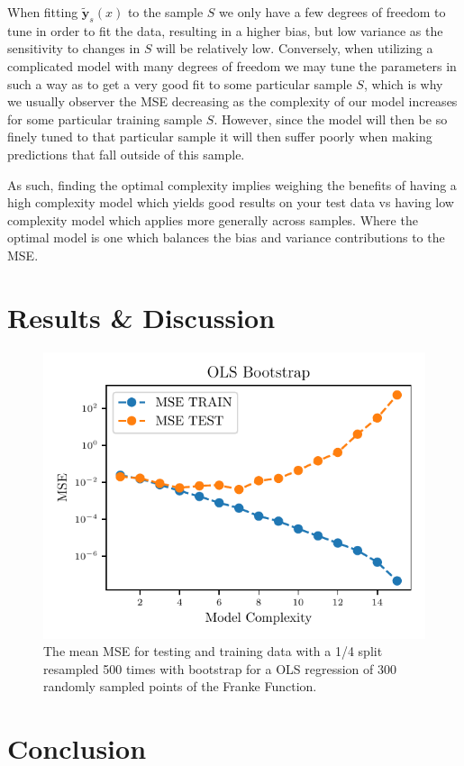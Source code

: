 \documentclass[reprint, english, nofootinbib]{revtex4-2}
\begin{document}
        When fitting $\mathbf{\tilde y}_s(x)$ to the sample $S$ we only have a few degrees of freedom to tune in order to fit the data, resulting in a higher bias, but low variance as the sensitivity to changes in $S$ will be relatively low. Conversely, when utilizing a complicated model with many degrees of freedom we may tune the parameters in such a way as to get a very good fit to some particular sample $S$, which is why we usually observer the MSE decreasing as the complexity of our model increases for some particular training sample $S$. However, since the model will then be so finely tuned to that particular sample it will then suffer poorly when making predictions that fall outside of this sample.

        As such, finding the optimal complexity implies weighing the benefits of having a high complexity model which yields good results on your test data vs having low complexity model which applies more generally across samples. Where the optimal model is one which balances the bias and variance contributions to the MSE.


\section{Results \& Discussion}

    \begin{figure}[h!tb]
        \center
        \includegraphics[width=\columnwidth]{../figs/OLS_MSE_Bootstrap_Hastie_211.pdf}
        \caption{\label{fig:Hastie2.11 MSE Bootstrap}The mean MSE for testing and training data with a 1/4 split resampled 500 times with bootstrap for a OLS regression of 300 randomly sampled points of the Franke Function.}
    \end{figure}


\section{Conclusion}

\onecolumngrid

\newpage
\twocolumngrid
\appendix
\end{document}
